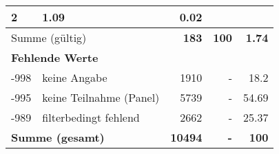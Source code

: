 \begin{longtable}{lXrrr}
       \num{2} &
       \num[round-mode=places,round-precision=2]{1,09} &
         \num[round-mode=places,round-precision=2]{0,02} \\
     \midrule
     \multicolumn{2}{l}{Summe (gültig)} &
       \textbf{\num{183}} &
     \textbf{100} &
       \textbf{\num[round-mode=places,round-precision=2]{1,74}} \\
     \multicolumn{5}{l}{\textbf{Fehlende Werte}}\\
       -998 &
       keine Angabe &
         \num{1910} &
        - &
         \num[round-mode=places,round-precision=2]{18,2} \\
       -995 &
       keine Teilnahme (Panel) &
         \num{5739} &
        - &
         \num[round-mode=places,round-precision=2]{54,69} \\
       -989 &
       filterbedingt fehlend &
         \num{2662} &
        - &
         \num[round-mode=places,round-precision=2]{25,37} \\
     \midrule
     \multicolumn{2}{l}{\textbf{Summe (gesamt)}} &
          \textbf{\num{10494}} &
        \textbf{-} &
        \textbf{100} \\
     \bottomrule
     \end{longtable}
     
